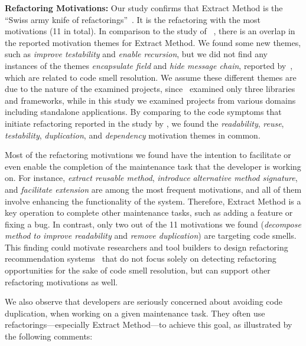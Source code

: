 \noindent\textbf{Refactoring Motivations:} Our study confirms that {\textsc Extract Method} is  the 
``Swiss army knife of refactorings''~\citep{tsantalis_empiricalstudy}. It is the refactoring with the most motivations (11 in total).
In comparison to the study of ~\cite{tsantalis_empiricalstudy}, there is an overlap in the reported motivation themes for {\textsc Extract Method}.
We found some new themes, such as \emph{improve testability} and \emph{enable recursion}, but we did not find any instances of
the themes \emph{encapsulate field} and \emph{hide message chain}, reported by~\cite{tsantalis_empiricalstudy}, which are related to code smell resolution.
We assume these different themes are due to the nature of the examined projects, since~\cite{tsantalis_empiricalstudy} examined only
three libraries and frameworks, while in this study we examined \studiedProjects projects from various domains including standalone applications.
By comparing to the code symptoms that initiate refactoring reported in the study by \cite{kim-tse-2014}, we found the \emph{readability},
\emph{reuse}, \emph{testability}, \emph{duplication}, and \emph{dependency} motivation themes in common.

Most of the refactoring motivations we found have the intention to facilitate or even enable the completion of the maintenance task that the developer is working on.
For instance, \emph{extract reusable method}, \emph{introduce alternative method signature}, and \emph{facilitate extension}
are among the most frequent motivations, and all of them involve enhancing the functionality of the system.
Therefore, {\textsc Extract Method} is a key operation to complete other
maintenance tasks, such as adding a feature or fixing a bug.
In contrast, only two out of the 11 motivations we found (\emph{decompose method to improve readability} and \emph{remove duplication}) are targeting code smells. %
This finding could motivate researchers and tool builders to design
refactoring recommendation systems~\citep{Tsantalis:2011, Silva:2014, Tairas:2012, Hotta:2012, Meng:2015, Tsantalis:2015}
that do not focus solely on detecting refactoring opportunities for the sake of code smell resolution, but can support other refactoring motivations as well.

We also observe that developers are seriously concerned about avoiding code duplication, when working on a given maintenance task. They often use refactorings---especially {\textsc Extract Method}---to
achieve this goal, as illustrated by the following comments:\margin

